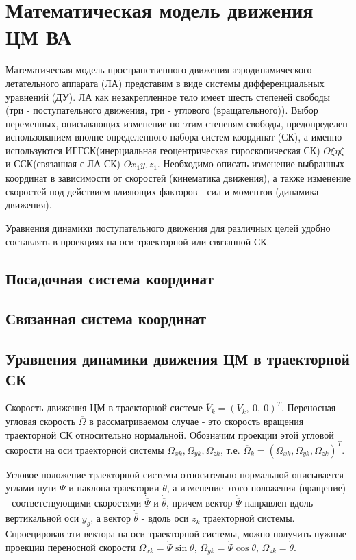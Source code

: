 \section{Математическая модель движения ЦМ ВА}

Математическая модель пространственного движения аэродинамического летательного аппарата (ЛА) представим в виде системы дифференциальных уравнений (ДУ). ЛА как незакрепленное тело имеет шесть степеней свободы (три - поступательного движения, три - углового (вращательного)). Выбор переменных, описывающих изменение по этим степеням свободы, предопределен использованием вполне определенного набора систем координат (СК), а именно используются ИГГСК(инерциальная геоцентрическая гироскопическая СК) $O\xi \eta \zeta$ и ССК(связанная с ЛА СК) $O x_1 y_1 z_1$. Необходимо описать изменение выбранных координат в зависимости от скоростей (кинематика движения), а также изменение скоростей под действием влияющих факторов - сил и моментов (динамика движения).

Уравнения динамики поступательного движения для различных целей удобно составлять в проекциях на оси траекторной или связанной СК.

\clearpage

\subsection{Посадочная система координат}
\clearpage

\subsection{Связанная система координат}
\clearpage

\subsection{Уравнения динамики движения ЦМ в траекторной СК}
Скорость движения ЦМ в траекторной системе $\overline{V}_k = (V_k, \  0, \  0)^T$. Переносная угловая скорость $\overline{\Omega}$ в рассматриваемом случае - это скорость вращения траекторной СК относительно нормальной. Обозначим проекции этой угловой скорости на оси траекторной системы $\Omega_{xk}, \Omega_{yk}, \Omega_{zk}$, т.е. $\overline{\Omega}_k = (\Omega_{xk}, \Omega_{yk}, \Omega_{zk})^T$.

Угловое положение траекторной системы относительно нормальной описывается углами пути $\Psi$ и наклона траектории $\theta$, а изменение этого положения (вращение) - соответствующими скоростями $\Dot{\overline{\Psi}}$ и $\Dot{\overline{\theta}}$, причем вектор $\Dot{\overline{\Psi}}$ направлен вдоль вертикальной оси $y_g$, а вектор $\Dot{\overline{\theta}}$ - вдоль оси $z_k$ траекторной системы. Спроецировав эти вектора на оси траекторной системы, можно  получить нужные проекции переносной скорости $\Omega_{xk} = \Dot{\Psi} \sin{\theta}$, $\Omega_{yk} = \Dot{\Psi} \cos{\theta}$, $\Omega_{zk} =\Dot{\theta}$.

